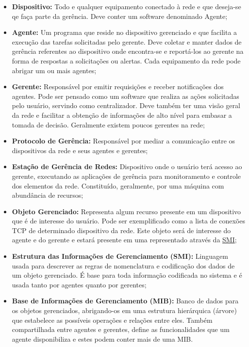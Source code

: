 \documentclass[twoside,english,brazilian]{UNISINOSmonografia}
\begin{document}
\begin{itemize}

\item \textbf{Dispositivo:}
	Todo e qualquer equipamento conectado à rede e que deseja-se qe faça parte
da gerência. 
Deve conter um software denominado Agente;

\item \textbf{Agente:}
	Um programa que reside no dispositivo gerenciado e que facilita a execução
das tarefas solicitadas pelo gerente. 
Deve coletar e manter dados de gerência referentes ao dispositivo onde 
encontra-se e reportá-los ao gerente na forma de respostas a solicitações ou 
alertas.
Cada equipamento da rede pode abrigar um ou mais agentes;
	
\item \textbf{Gerente:}
	Responsável por emitir requisições e receber notificações dos agentes.
Pode ser pensado como um software que realiza as ações solicitadas pelo 
usuário, servindo como centralizador.
Deve também ter uma visão geral da rede e facilitar a obtenção de informações 
de alto nível para embasar a tomada de decisão.
Geralmente existem poucos gerentes na rede;

\item \textbf{Protocolo de Gerência:}
	Responsável por mediar a comunicação entre os dispositivos da rede e seus 
agentes e gerentes;

\item \textbf{Estação de Gerência de Redes:}
	Dispositivo onde o usuário terá acesso ao gerente, executando as 
aplicações de gerência para monitoramento e controle dos elementos da rede.
Constituído, geralmente, por uma máquina com abundância de recursos;

\item \textbf{Objeto Gerenciado:}
	Representa algum recurso presente em um dispositivo que é de interesse do 
usuário.
Pode ser exemplificado como a lista de conexões TCP de determinado dispositivo 
da rede.
Este objeto será de interesse do agente e do gerente e estará presente em uma 
representado através da \hyperref[siglas]{SMI};

\item \textbf{Estrutura das Informações de Gerenciamento (SMI):}
	Linguagem usada para descrever as regras de nomenclatura e codificação 
dos dados de um objeto gerenciado. 
É base para toda informação codificada no sistema e é usada tanto por agentes 
quanto por gerentes;

\item \textbf{Base de Informações de Gerenciamento (MIB):}
	Banco de dados para os objetos gerenciados, abrigando-os em uma estrutura 
hierárquica (árvore) que estabelece as possíveis operações e relações entre 
eles.
Também compartilhada entre agentes e gerentes, define as funcionalidades que 
um agente disponibiliza e estes podem conter mais de uma MIB.

\end{itemize}
\end{document}
